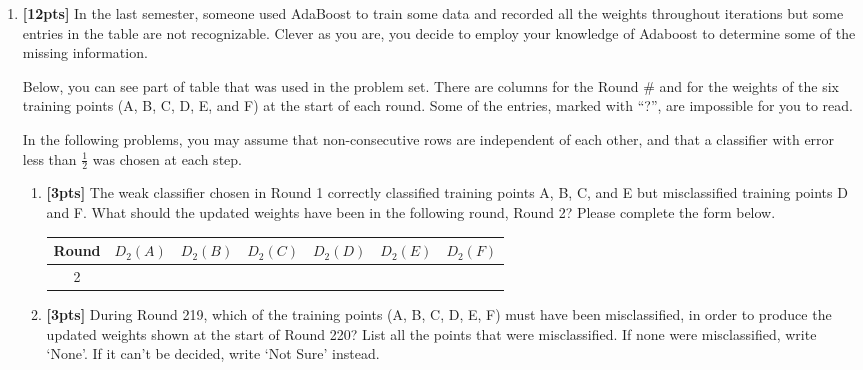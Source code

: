 \begin{enumerate}
    \item \textbf{[12pts]} In the last semester, someone used AdaBoost to train some data and recorded all the weights throughout iterations but some entries in the table are not recognizable. Clever as you are, you decide to employ your knowledge of Adaboost to determine some of the missing information.
    
    Below, you can see part of table that was used in the problem set. There are columns for the Round \# and for the weights of the six training points (A, B, C, D, E, and F) at the start of each round. Some of the entries, marked with “?”, are impossible for you to read.
    

    

In the following problems, you may assume that non-consecutive rows are independent of each other, and that a classifier with error less than $\frac{1}{2}$ was chosen at each step.

   \begin{enumerate}
        \item \textbf{[3pts]}  The weak classifier chosen in Round 1 correctly classified training points A, B, C, and E but misclassified training points D and F. What should the updated weights have been in the following round, Round 2? Please complete the form below.
   
\begin{table}[h!]
\begin{center}
\begin{tabular}{ |c|c|c|c|c|c|c| } 
 \hline
 Round & $D_2(A)$ & $D_2(B)$ & $D_2(C)$ & $D_2(D)$ & $D_2(E)$ & $D_2(F)$\\ [4pt]
  \hline
  \hline
 2 &   &  &   &   &   &   \\ [4pt]
\hline
\end{tabular}
\end{center}
\end{table}  

    \item \textbf{[3pts]} During Round 219, which of the training points (A, B, C, D, E, F) must have been misclassified, in order to produce the updated weights shown at the start of Round 220? List all the points that were misclassified. If none were misclassified, write `None'. If it can't be decided, write `Not Sure' instead.
    
    \begin{tcolorbox}[fit,height=1cm, width=6cm, blank, borderline={1pt}{-2pt},nobeforeafter]
    \end{tcolorbox}\\


\end{enumerate}
\end{enumerate}
